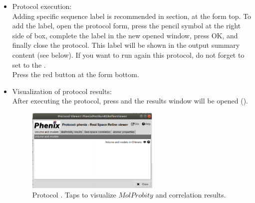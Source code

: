 \begin{itemize}
 \item Protocol execution:\\
 Adding specific sequence label is recommended in  section, at the form top. To add the label, open the protocol form, press the pencil symbol at the right side of  box, complete the label in the new opened window, press OK, and finally close the protocol. This label will be shown in the output summary content (see below). If you want to run again this protocol, do not forget to set to  the .\\
  Press the  red button at the form bottom.\\
  
 \item Visualization of protocol results:\\
 
 After executing the protocol, press  and the results window will be opened ().\\ 
  
    \begin{figure}[H]
     \centering 
     \captionsetup{width=.7\linewidth} 
     \includegraphics[width=0.60\textwidth]{Images_appendix/Fig149.pdf}
     \caption{Protocol . Taps to visualize $MolProbity$  and  correlation results.}
     \label{fig:app_protocol_real_space_refine_2}
    \end{figure}
    

\end{itemize}
